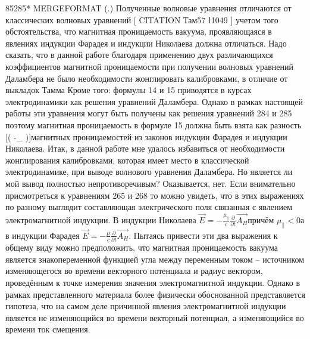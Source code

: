 \documentclass[11pt]{article}
\begin{document}
85285* MERGEFORMAT (.) Полученные волновые уравнения отличаются от
классических волновых уравнений {[} CITATION Там57 \l 1049 {]} учетом
того обстоятельства, что магнитная проницаемость вакуума, проявляющаяся
в явлениях индукции Фарадея и индукции Николаева должна отличаться. Надо
сказать, что в данной работе благодаря применению двух различающихся
коэффициентов магнитной проницаемости при получении волновых уравнений
Даламбера не было необходимости жонглировать калибровками, в отличие от
выкладок Тамма Кроме того: формулы 14 и 15 приводятся в курсах
электродинамики как решения уравнений Даламбера. Однако в рамках
настоящей работы эти уравнения могут быть получены как решения уравнений
284 и 285 поэтому магнитная проницаемость в формуле 15 должна быть взята
как разность {[}\left( \mu -{{\mu }\_{\parallel }}
\right){]}магнитных проницаемостей из законов индукции Фарадея и
индукции Николаева. Итак, в данной работе мне удалось избавиться от
необходимости жонглирования калибровками, которая имеет место в
классической электродинамике, при выводе волнового уравнения Даламбера.
Но является ли мой вывод полностью непротиворечивым? Оказывается, нет.
Если внимательно присмотреться к уравнениям 265 и 268 то можно увидеть,
что в этих выражениях по разному выглядит составляющая электрического
поля связанная с явлением электромагнитной индукции. В индукции
Николаева
\(\overrightarrow{E}=-\frac{{{\mu }_{\parallel }}}{c}\frac{\partial }{\partial t}\overrightarrow{{{A}_{H}}}\)причём
\({{\mu }_{\parallel }}<0\)а в индукции Фарадея
\(\overrightarrow{E}=-\frac{\mu }{c}\frac{\partial }{\partial t}\overrightarrow{{{A}_{H}}}\).
Пытаясь привести эти два выражения к общему виду можно предположить, что
магнитная проницаемость вакуума является знакопеременной функцией угла
между переменным током -- источником изменяющегося во времени векторного
потенциала и радиус вектором, проведённым к точке измерения значения
электромагнитной индукции. Однако в рамках представленного материала
более физически обоснованной представляется гипотеза, что на самом деле
причинной явления электромагнитной индукции является не изменяющийся во
времени векторный потенциал, а изменяющийся во времени ток смещения.

\end{document}
